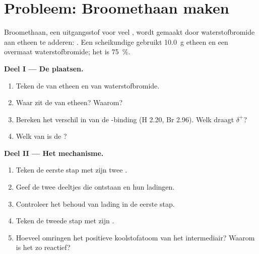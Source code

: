 \section{Probleem: Broomethaan maken}

\begin{problem}
\label{pb:g12:curly-arrows:1}
Broomethaan, een uitgangsstof voor veel , wordt gemaakt door
waterstofbromide aan etheen te adderen: .
Een scheikundige gebruikt \qty{10.0}{g} etheen en een overmaat
waterstofbromide; het  is \qty{75}{\percent}.

\medskip
\noindent\textbf{Deel I --- De plaatsen.}
\begin{enumerate}
  \item Teken de  van etheen en van waterstofbromide.
  \item Waar zit de  van etheen? Waarom?
  \item Bereken het verschil in  van de
        -binding (H 2.20, Br 2.96). Welk  draagt
        $\delta^+$?
  \item Welk  van  is de ?
\end{enumerate}

\medskip
\noindent\textbf{Deel II --- Het mechanisme.}
\begin{enumerate}[resume]
  \item Teken de eerste stap met zijn twee .
  \item Geef de twee deeltjes die ontstaan en hun ladingen.
  \item Controleer het behoud van lading in de eerste stap.
  \item Teken de tweede stap met zijn .
  \item Hoeveel  omringen het positieve koolstofatoom van het
        intermediair? Waarom is het zo reactief?
\end{enumerate}


\end{problem}
